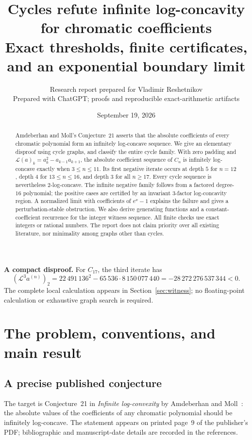 \documentclass[11pt,a4paper]{article}
\title{\vspace{-1.2em}\color{ink}\bfseries Cycles refute infinite log-concavity\\
for chromatic coefficients\\[0.55em]
\large Exact thresholds, finite certificates, and an exponential boundary limit}
\author{Research report prepared for Vladimir Reshetnikov\\
\small Prepared with ChatGPT; proofs and reproducible exact-arithmetic artifacts}
\date{September 19, 2026}
\theoremstyle{definition}
\newcommand{\Lop}{\mathcal L}
\newcommand{\aco}{a^{(n)}}
\begin{document}
\maketitle
\thispagestyle{empty}
\begin{abstract}
Amdeberhan and Moll's Conjecture~21 asserts that the absolute coefficients of
 every chromatic polynomial form an infinitely log-concave sequence. We give
 an elementary disproof using cycle graphs, and classify the entire cycle
 family. With zero padding and
 $\Lop(a)_k=a_k^2-a_{k-1}a_{k+1}$, the absolute coefficient sequence of $C_n$
 is infinitely log-concave exactly when $3\le n\le11$. Its first negative
 iterate occurs at depth $5$ for $n=12$, depth $4$ for $13\le n\le16$, and
 depth $3$ for all $n\ge17$. Every cycle sequence is nevertheless
 $2$-log-concave. The infinite negative family follows from a factored
 degree-$16$ polynomial; the positive cases are certified by an invariant
 $3$-factor log-concavity region. A normalized limit with coefficients of
 $e^x-1$ explains the failure and gives a perturbation-stable obstruction.
 We also derive generating functions and a constant-coefficient recurrence
 for the integer witness sequence. All finite checks use exact integers or
 rational numbers. The report does not claim priority over all existing
 literature, nor minimality among graphs other than cycles.
\end{abstract}

\begin{tcolorbox}[colback=soft,colframe=accent,boxrule=0.5pt]
\textbf{A compact disproof.} For $C_{17}$, the third iterate has
\[
  (\Lop^3\aco)_2
  =22\,491\,136^2-65\,536\cdot8\,150\,077\,440
  =-28\,272\,276\,537\,344<0.
\]
The complete local calculation appears in Section~\ref{sec:witness}; no
 floating-point calculation or exhaustive graph search is required.
\end{tcolorbox}

{\setlength{\parskip}{0pt}\small\tableofcontents}
\clearpage

\section{The problem, conventions, and main result}\label{sec:introduction}

\subsection{A precise published conjecture}
The target is Conjecture~21 in \emph{Infinite log-convexity} by
Amdeberhan and Moll~\cite{AM}: the absolute values of the coefficients of
any chromatic polynomial should be infinitely log-concave. The statement
appears on printed page~9 of the publisher's PDF; bibliographic and
manuscript-date details are recorded in the references.
\end{document}
